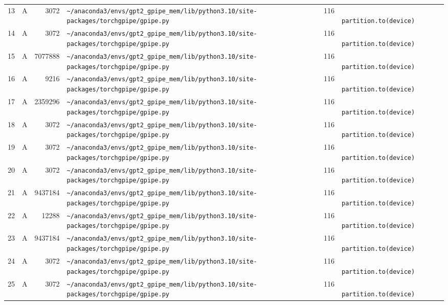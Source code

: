 \documentclass{article}
\begin{document}
\begin{longtable}{r l r p{6.5cm} r p{7.0cm}}
13 & A & 3072 & \lstinline|~/anaconda3/envs/gpt2_gpipe_mem/lib/python3.10/site-packages/torchgpipe/gpipe.py| & 116 & \lstinline|            partition.to(device)| \\
14 & A & 3072 & \lstinline|~/anaconda3/envs/gpt2_gpipe_mem/lib/python3.10/site-packages/torchgpipe/gpipe.py| & 116 & \lstinline|            partition.to(device)| \\
15 & A & 7077888 & \lstinline|~/anaconda3/envs/gpt2_gpipe_mem/lib/python3.10/site-packages/torchgpipe/gpipe.py| & 116 & \lstinline|            partition.to(device)| \\
16 & A & 9216 & \lstinline|~/anaconda3/envs/gpt2_gpipe_mem/lib/python3.10/site-packages/torchgpipe/gpipe.py| & 116 & \lstinline|            partition.to(device)| \\
17 & A & 2359296 & \lstinline|~/anaconda3/envs/gpt2_gpipe_mem/lib/python3.10/site-packages/torchgpipe/gpipe.py| & 116 & \lstinline|            partition.to(device)| \\
18 & A & 3072 & \lstinline|~/anaconda3/envs/gpt2_gpipe_mem/lib/python3.10/site-packages/torchgpipe/gpipe.py| & 116 & \lstinline|            partition.to(device)| \\
19 & A & 3072 & \lstinline|~/anaconda3/envs/gpt2_gpipe_mem/lib/python3.10/site-packages/torchgpipe/gpipe.py| & 116 & \lstinline|            partition.to(device)| \\
20 & A & 3072 & \lstinline|~/anaconda3/envs/gpt2_gpipe_mem/lib/python3.10/site-packages/torchgpipe/gpipe.py| & 116 & \lstinline|            partition.to(device)| \\
21 & A & 9437184 & \lstinline|~/anaconda3/envs/gpt2_gpipe_mem/lib/python3.10/site-packages/torchgpipe/gpipe.py| & 116 & \lstinline|            partition.to(device)| \\
22 & A & 12288 & \lstinline|~/anaconda3/envs/gpt2_gpipe_mem/lib/python3.10/site-packages/torchgpipe/gpipe.py| & 116 & \lstinline|            partition.to(device)| \\
23 & A & 9437184 & \lstinline|~/anaconda3/envs/gpt2_gpipe_mem/lib/python3.10/site-packages/torchgpipe/gpipe.py| & 116 & \lstinline|            partition.to(device)| \\
24 & A & 3072 & \lstinline|~/anaconda3/envs/gpt2_gpipe_mem/lib/python3.10/site-packages/torchgpipe/gpipe.py| & 116 & \lstinline|            partition.to(device)| \\
25 & A & 3072 & \lstinline|~/anaconda3/envs/gpt2_gpipe_mem/lib/python3.10/site-packages/torchgpipe/gpipe.py| & 116 & \lstinline|            partition.to(device)| \\

\end{longtable}
\end{document}
